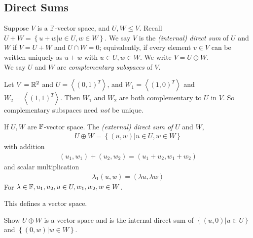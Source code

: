 \documentclass[a4paper]{article}
\begin{document}
\subsection{Direct Sums}
\begin{defi}
Suppose $V$ is a $\mathbb{F}$-vector space, and $U,W \leq V$. Recall $U+W = \left\{ u+w | u \in U, w \in W\right\}$. We say $V$ is the \emph{(internal) direct sum} of $U$ and $W$ if $V=U+W$ and $U \cap W = 0$; equivalently, if every element $v\in V$ can be written uniquely as $u+w$ with $u \in U, w \in W$. We write $V = U \oplus W$.\\
We say $U$ and $W$ are \emph{complementary subspaces} of $V$.
\end{defi}

\begin{eg}
Let $V = \mathbb{R}^2$ and $U = \left< \left(0,1\right)^T \right>$, and $W_1 = \left<\left(1,0\right)^T \right>$ and $W_2 = \left<\left(1,1\right)^T\right>$. Then $W_1$ and $W_2$ are both complementary to $U$ in $V$. So complementary subspaces need \emph{not} be unique.
\end{eg}

\begin{defi}
If $U,W$ are $\mathbb{F}$-vector space. The \emph{(external) direct sum of} $U$ and $W$,
\begin{equation*}
\begin{aligned}
U \oplus W = \left\{ \left(u,w\right) | u \in U, w \in W\right\}
\end{aligned}
\end{equation*}
with addition
\begin{equation*}
\begin{aligned}
\left(u_1,w_1\right) + \left(u_2,w_2\right) = \left(u_1+u_2,w_1+w_2\right)
\end{aligned}
\end{equation*}
and scalar multiplication
\begin{equation*}
\begin{aligned}
\lambda_1 \left(u,w\right) = \left(\lambda u,\lambda w\right)
\end{aligned}
\end{equation*}
For $\lambda \in \mathbb{F}, u_1,u_2,u \in U, w_1,w_2,w\in W$.

This defines a vector space.
\end{defi}

\begin{prob}
Show $U\oplus W$ is a vector space and is the internal direct sum of $\left\{\left(u,0\right)|u \in U\right\}$ and $\left\{\left(0,w\right)|w \in W\right\}$.
\end{prob}
\end{document}
